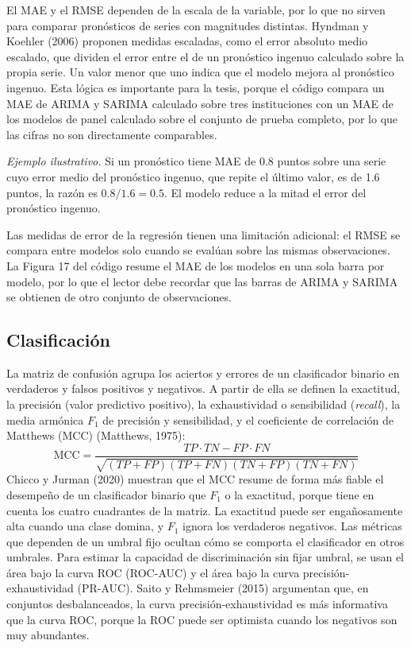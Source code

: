 El MAE y el RMSE dependen de la escala de la variable, por lo que no sirven para comparar pronósticos de series con magnitudes distintas. Hyndman y Koehler (2006) proponen medidas escaladas, como el error absoluto medio escalado, que dividen el error entre el de un pronóstico ingenuo calculado sobre la propia serie. Un valor menor que uno indica que el modelo mejora al pronóstico ingenuo. Esta lógica es importante para la tesis, porque el código compara un MAE de ARIMA y SARIMA calculado sobre tres instituciones con un MAE de los modelos de panel calculado sobre el conjunto de prueba completo, por lo que las cifras no son directamente comparables.

\textit{Ejemplo ilustrativo.} Si un pronóstico tiene MAE de 0.8 puntos sobre una serie cuyo error medio del pronóstico ingenuo, que repite el último valor, es de 1.6 puntos, la razón es $0.8/1.6=0.5$. El modelo reduce a la mitad el error del pronóstico ingenuo.

Las medidas de error de la regresión tienen una limitación adicional: el RMSE se compara entre modelos solo cuando se evalúan sobre las mismas observaciones. La Figura 17 del código resume el MAE de los modelos en una sola barra por modelo, por lo que el lector debe recordar que las barras de ARIMA y SARIMA se obtienen de otro conjunto de observaciones.

\subsection{Clasificación}
La matriz de confusión agrupa los aciertos y errores de un clasificador binario en verdaderos y falsos positivos y negativos. A partir de ella se definen la exactitud, la precisión (valor predictivo positivo), la exhaustividad o sensibilidad (\textit{recall}), la media armónica $F_1$ de precisión y sensibilidad, y el coeficiente de correlación de Matthews (MCC) (Matthews, 1975):
\begin{equation}
\text{MCC} = \frac{TP\cdot TN - FP\cdot FN}{\sqrt{(TP+FP)(TP+FN)(TN+FP)(TN+FN)}}
\label{eq:mcc}
\end{equation}
Chicco y Jurman (2020) muestran que el MCC resume de forma más fiable el desempeño de un clasificador binario que $F_1$ o la exactitud, porque tiene en cuenta los cuatro cuadrantes de la matriz. La exactitud puede ser engañosamente alta cuando una clase domina, y $F_1$ ignora los verdaderos negativos. Las métricas que dependen de un umbral fijo ocultan cómo se comporta el clasificador en otros umbrales. Para estimar la capacidad de discriminación sin fijar umbral, se usan el área bajo la curva ROC (ROC-AUC) y el área bajo la curva precisión-exhaustividad (PR-AUC). Saito y Rehmsmeier (2015) argumentan que, en conjuntos desbalanceados, la curva precisión-exhaustividad es más informativa que la curva ROC, porque la ROC puede ser optimista cuando los negativos son muy abundantes.


